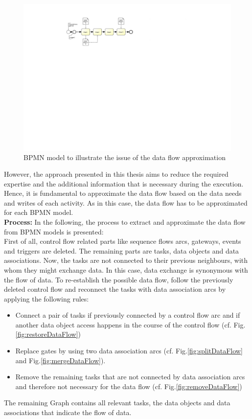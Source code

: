 \begin{figure}[h!]
	\centering
	\includegraphics[width=\textwidth, trim={3.5cm 15cm 12.5cm 2cm}]{img/ExtractDFDProblem.pdf}
	\caption{BPMN model to illustrate the issue of the data flow approximation}
	\label{fig:problemDataFlow}
\end{figure}

\noindent
However, the approach presented in this thesis aims to reduce the required expertise and the additional information that is necessary during the execution. 
Hence, it is fundamental to approximate the data flow based on the data needs and writes of each activity. As in this case, the data flow has to be approximated for each BPMN model. \\

\noindent
\textbf{Process:} In the following, the process to extract and approximate the data flow from BPMN models is presented: \\
First of all, control flow related parts like sequence flows arcs, gateways, events and triggers are deleted. The remaining parts are tasks, data objects and data associations. Now, the tasks are not connected to their previous neighbours, with whom they might exchange data. In this case, data exchange is synonymous with the flow of data.
To re-establish the possible data flow, follow the previously deleted control flow and reconnect the tasks with data association arcs by applying the following rules:

\begin{itemize}
	\item Connect a pair of tasks if previously connected by a control flow arc and 
	if another data object access happens in the course of the control flow (cf. Fig.\ref{fig:restoreDataFlow})
	\item Replace gates by using two data association arcs (cf. Fig.\ref{fig:splitDataFlow} and Fig.\ref{fig:mergeDataFlow}). 
	\item Remove the remaining tasks that are not connected by data association arcs and therefore not necessary for the data flow (cf. Fig.\ref{fig:removeDataFlow})
	
\end{itemize}
The remaining Graph contains all relevant tasks, the data objects and data associations that indicate the flow of data.


